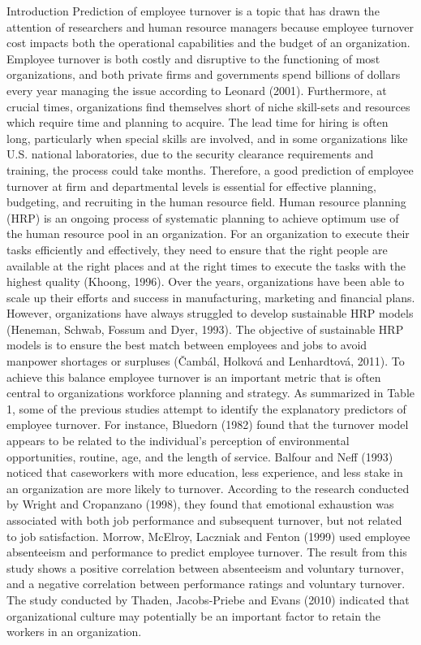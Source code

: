 Introduction
Prediction of employee turnover is a topic that has drawn the attention of researchers and human resource managers because employee turnover cost impacts both the operational capabilities and the budget of an organization. Employee turnover is both costly and disruptive to the functioning of most organizations, and both private firms and governments spend billions of dollars every year managing the issue according to Leonard (2001). Furthermore, at crucial times, organizations find themselves short of niche skill-sets and resources which require time and planning to acquire. The lead time for hiring is often long, particularly when special skills are involved, and in some organizations like U.S. national laboratories, due to the security clearance requirements and training, the process could take months. Therefore, a good prediction of employee turnover at firm and departmental levels is essential for effective planning, budgeting, and recruiting in the human resource field. 
Human resource planning (HRP) is an ongoing process of systematic planning to achieve optimum use of the human resource pool in an organization. For an organization to execute their tasks efficiently and effectively, they need to ensure that the right people are available at the right places and at the right times to execute the tasks with the highest quality (Khoong, 1996). Over the years, organizations have been able to scale up their efforts and success in manufacturing, marketing and financial plans. However, organizations have always struggled to develop sustainable HRP models (Heneman, Schwab, Fossum and Dyer, 1993). The objective of sustainable HRP models is to ensure the best match between employees and jobs to avoid manpower shortages or surpluses (Čambál, Holková and Lenhardtová, 2011). To achieve this balance employee turnover is an important metric that is often central to organizations workforce planning and strategy.
As summarized in Table 1, some of the previous studies attempt to identify the explanatory predictors of employee turnover. For instance, Bluedorn (1982) found that the turnover model appears to be related to the individual’s perception of environmental opportunities, routine, age, and the length of service. Balfour and Neff (1993) noticed that caseworkers with more education, less experience, and less stake in an organization are more likely to turnover. According to the research conducted by Wright and Cropanzano (1998), they found that emotional exhaustion was associated with both job performance and subsequent turnover, but not related to job satisfaction. Morrow, McElroy, Laczniak and Fenton (1999) used employee absenteeism and performance to predict employee turnover. The result from this study shows a positive correlation between absenteeism and voluntary turnover, and a negative correlation between performance ratings and voluntary turnover. The study conducted by Thaden, Jacobs-Priebe and Evans (2010) indicated that organizational culture may potentially be an important factor to retain the workers in an organization.
